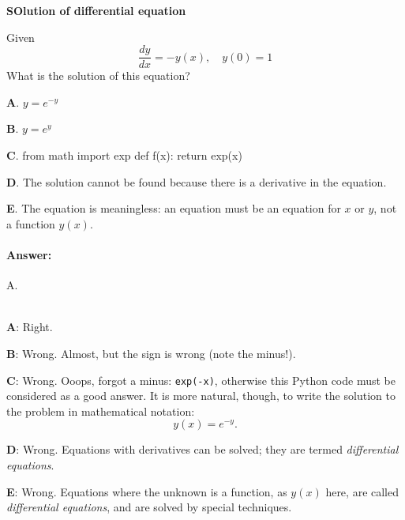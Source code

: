\documentclass[%
oneside,                 %
final,                   %
10pt]{article}
\newenvironment{doconcequiz}{}{}
\newcounter{doconcequizcounter}
\newenvironment{doconceexercise}{}{}
\theoremstyle{definition}
\begin{document}
\begin{enumerate}
\begin{doconceexercise}
\label{sec:this:exer:de}

\begin{doconcequiz}
\label{quiz:diff:eq1}


\noindent\textbf{\large SOlution of differential equation}

\noindent
Given
\[ \frac{dy}{dx} = -y(x),\quad y(0)=1 \]
What is the solution of this equation?

\vspace{2mm}

\textbf{A}. 
$y=e^{-y}$

\textbf{B}. 
$y=e^{y}$

\textbf{C}. 
\bpycod
from math import exp
def f(x):
    return exp(x)

\epycod

\textbf{D}. 
The solution cannot be found because there is a derivative in the equation.

\textbf{E}. 
The equation is meaningless: an equation must be an equation
for $x$ or $y$, not a function $y(x)$.


\paragraph{Answer:} A.

\\


\textbf{A}: Right. 

\textbf{B}: Wrong. Almost, but the sign is wrong (note the minus!).

\textbf{C}: Wrong. Ooops, forgot a minus: \texttt{exp(-x)}, otherwise this Python code
must be considered as a good answer. It is more natural,
though, to write the solution to the problem
in mathematical notation:
\[ y(x) = e^{-y}.\]

\textbf{D}: Wrong. Equations with derivatives can be solved;
they are termed \emph{differential
equations}.

\textbf{E}: Wrong. Equations where the unknown is a function, as $y(x)$
here, are called \emph{differential equations}, and are solved by
special techniques.




\vspace{3mm}

\end{doconcequiz}



\end{doconceexercise}
\end{enumerate}
\end{document}
